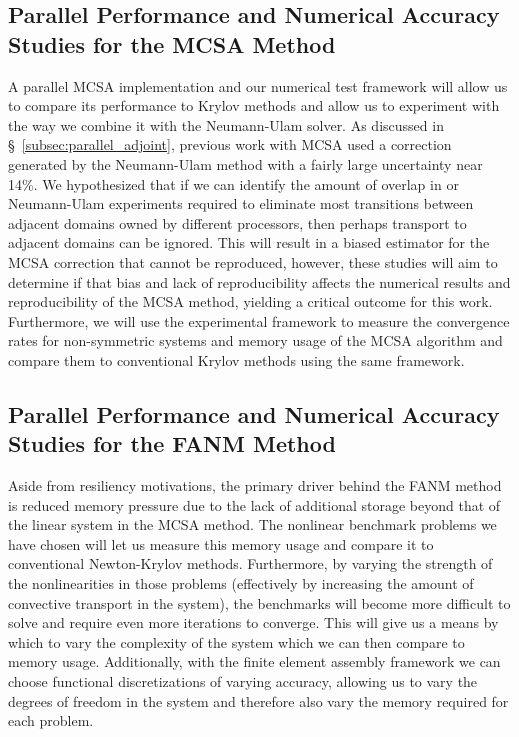 \subsection{Parallel Performance and Numerical Accuracy Studies for
  the MCSA Method}
\label{subsec:mcsa_studies}
A parallel MCSA implementation and our numerical test framework will
allow us to compare its performance to Krylov methods and allow us to
experiment with the way we combine it with the Neumann-Ulam solver. As
discussed in \S~\ref{subsec:parallel_adjoint}, previous work with
MCSA used a correction generated by the Neumann-Ulam method with a
fairly large uncertainty near 14\%. We hypothesized that if we can
identify the amount of overlap in or Neumann-Ulam experiments required
to eliminate most transitions between adjacent domains owned by
different processors, then perhaps transport to adjacent domains can
be ignored. This will result in a biased estimator for the MCSA
correction that cannot be reproduced, however, these studies will aim
to determine if that bias and lack of reproducibility affects the
numerical results and reproducibility of the MCSA method, yielding a
critical outcome for this work. Furthermore, we will use the
experimental framework to measure the convergence rates for
non-symmetric systems and memory usage of the MCSA algorithm and
compare them to conventional Krylov methods using the same framework.

\subsection{Parallel Performance and Numerical Accuracy Studies for
  the FANM Method}
\label{subsec:fanm_studies}
Aside from resiliency motivations, the primary driver behind the FANM
method is reduced memory pressure due to the lack of additional
storage beyond that of the linear system in the MCSA method. The
nonlinear benchmark problems we have chosen will let us measure this
memory usage and compare it to conventional Newton-Krylov
methods. Furthermore, by varying the strength of the nonlinearities in
those problems (effectively by increasing the amount of convective
transport in the system), the benchmarks will become more difficult to
solve and require even more iterations to converge. This will give us
a means by which to vary the complexity of the system which we can
then compare to memory usage. Additionally, with the finite element
assembly framework we can choose functional discretizations of varying
accuracy, allowing us to vary the degrees of freedom in the system and
therefore also vary the memory required for each problem.

